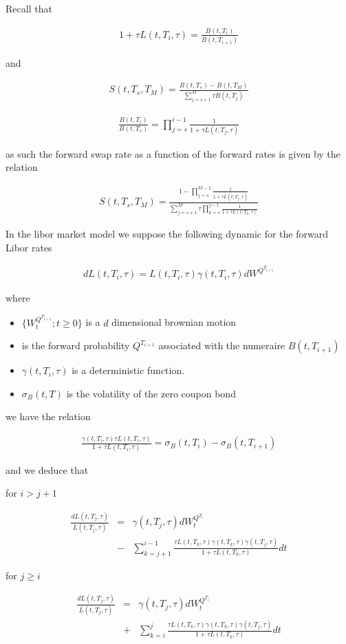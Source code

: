\documentclass[10pt,a4paper,english,landscape]{slides}
\newcommand{\ban}{\begin{eqnarray*}}
\newcommand{\ean}{\end{eqnarray*}}
\newcommand{\ba}{\begin{eqnarray}}
\newcommand{\ea}{\end{eqnarray}}
\begin{document}
Recall that 

\ban
1+\tau L(t,T_i,\tau)=\frac{B(t,T_i)}{B(t,T_{i+1})} 
\ean

and

\ban
S(t,T_s,T_M)=\frac{B(t,T_s)-B(t,T_M)}{\sum_{j=s+1}^{M}\tau B(t,T_j)}
\ean

\ban
\frac{B(t,T_i)}{B(t,T_s)}=\prod_{j=s}^{i-1}\frac{1}{1+\tau L(t,T_j,\tau)}
\ean

as such the forward swap rate as a function of the forward rates is given by the relation

\ba
S(t,T_s,T_M)=\frac{1 - \prod_{j=s}^{M-1}\frac{1}{1+\tau L(t,T_j,\tau)} }{\sum_{j=s+1}^{M}\tau \prod_{k=s}^{j-1}\frac{1}{1+\tau L(t,T_k,\tau)}} \label{tswaptfor}
\ea

In the libor market model we suppose the following dynamic for the forward Libor rates


\ban
dL(t,T_i,\tau)=L(t,T_i,\tau)\gamma(t,T_i,\tau)dW^{Q^{T_{i+1}}}
\ean

where 

\begin{itemize}
\item $\lbrace W^{Q^{T_{i+1}}}_t; t\geq 0 \rbrace$ is a $d$ dimensional brownian motion 
\item is the forward probability $Q^{T_{i+1}}$ associated with the numeraire $B(t,T_{i+1})$
\item  $\gamma(t,T_i,\tau)$ is a deterministic function. 
\item $\sigma_B(t,T)$ is the volatility of the zero coupon bond
\end{itemize}

we have the relation

\ban
\frac{\gamma(t,T_i,\tau)\tau L(t,T_i,\tau)}{1+\tau L(t,T_i,\tau)}=\sigma_B(t,T_i)-\sigma_B(t,T_{i+1})
\ean

and we deduce that

for  $i>j+1$ 

\ban
\frac{dL(t,T_j,\tau)}{L(t,T_j,\tau)}&=&\gamma(t,T_j,\tau)dW^{Q^{T_i}}_t \\
&-& \sum_{k=j+1}^{i-1}\frac{\tau L(t,T_k,\tau) \gamma(t,T_k,\tau) \gamma(t,T_j,\tau) }{1+\tau L(t,T_k,\tau)}dt
\ean

for  $j\geq i$ 

\ban
\frac{dL(t,T_j,\tau)}{L(t,T_j,\tau)}&=&\gamma(t,T_j,\tau)dW^{Q^{T_i}}_t \\
&+&\sum_{k=i}^{j}\frac{\tau L(t,T_k,\tau)\gamma(t,T_k,\tau)\gamma(t,T_j,\tau)}{1+\tau L(t,T_k,\tau)}dt
\ean
\end{document}
